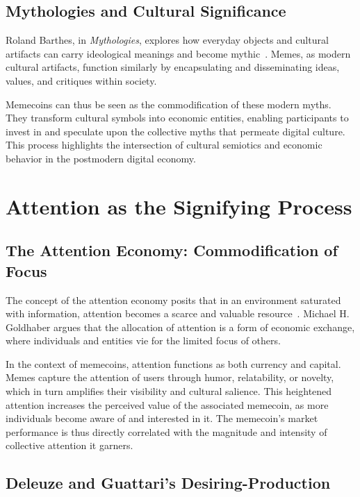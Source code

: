 \documentclass[a4paper,12pt]{article}
\begin{document}
\subsection{Mythologies and Cultural Significance}

Roland Barthes, in \textit{Mythologies}, explores how everyday objects and cultural artifacts can carry ideological meanings and become mythic~\cite{barthes1972mythologies}. Memes, as modern cultural artifacts, function similarly by encapsulating and disseminating ideas, values, and critiques within society.

Memecoins can thus be seen as the commodification of these modern myths. They transform cultural symbols into economic entities, enabling participants to invest in and speculate upon the collective myths that permeate digital culture. This process highlights the intersection of cultural semiotics and economic behavior in the postmodern digital economy.

\section{Attention as the Signifying Process}

\subsection{The Attention Economy: Commodification of Focus}

The concept of the attention economy posits that in an environment saturated with information, attention becomes a scarce and valuable resource~\cite{goldhaber1997attention}. Michael H. Goldhaber argues that the allocation of attention is a form of economic exchange, where individuals and entities vie for the limited focus of others.

In the context of memecoins, attention functions as both currency and capital. Memes capture the attention of users through humor, relatability, or novelty, which in turn amplifies their visibility and cultural salience. This heightened attention increases the perceived value of the associated memecoin, as more individuals become aware of and interested in it. The memecoin's market performance is thus directly correlated with the magnitude and intensity of collective attention it garners.

\subsection{Deleuze and Guattari's Desiring-Production}
\end{document}
